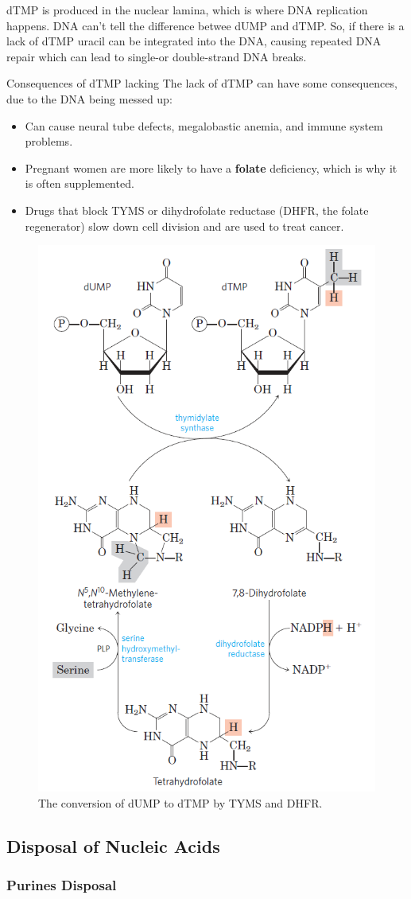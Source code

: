 \documentclass[../main.tex]{subfiles}
\begin{document}
dTMP is produced in the nuclear lamina, which is where DNA replication happens. DNA can't tell the difference betwee dUMP and dTMP. So, if there is a lack of dTMP uracil can be integrated into the DNA, causing repeated DNA repair which can lead to single-or double-strand DNA breaks.

\begin{RemarkWithTitel}{Consequences of dTMP lacking} The lack of dTMP can have some consequences, due to the DNA being messed up: 
	\begin{itemize}
		\item Can cause neural tube defects, megalobastic anemia, and immune system problems.
		\item Pregnant women are more likely to have a \textbf{\gls{folate}} deficiency, which is why it is often supplemented.
		\item Drugs that block TYMS or dihydrofolate reductase (DHFR, the folate regenerator) slow down cell division and are used to treat cancer.
	\end{itemize} 
\end{RemarkWithTitel}
 
\begin{figure}[H]
	\centering
	\includegraphics[width=0.4\linewidth]{dTMP_path}
	\caption{The conversion of dUMP to dTMP by TYMS and DHFR.}
	\label{fig:dtmppath}
\end{figure}


\subsection{Disposal of Nucleic Acids}
\subsubsection{Purines Disposal}
\end{document}
